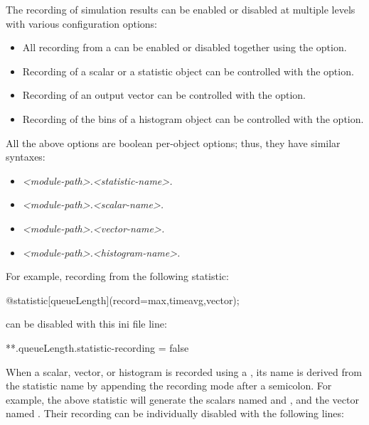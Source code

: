 The recording of simulation results can be enabled or disabled at multiple
levels with various configuration options:

\begin{itemize}
  \item All recording from a  can be enabled or disabled
    together using the  option.
  \item Recording of a scalar or a statistic object can be controlled with the
     option.
  \item Recording of an output vector can be controlled with the
     option.
  \item Recording of the bins of a histogram object can be controlled with the
     option.
\end{itemize}

All the above options are boolean per-object options; thus, they have similar syntaxes:

\begin{itemize}
  \item \textit{<module-path>.<statistic-name>.}
  \item \textit{<module-path>.<scalar-name>.}
  \item \textit{<module-path>.<vector-name>.}
  \item \textit{<module-path>.<histogram-name>.}
\end{itemize}

For example, recording from the following statistic:

\begin{ned}
@statistic[queueLength](record=max,timeavg,vector);
\end{ned}

can be disabled with this ini file line:

\begin{inifile}
**.queueLength.statistic-recording = false
\end{inifile}

When a scalar, vector, or histogram is recorded using a , its
name is derived from the statistic name by appending the recording mode after a
semicolon. For example, the above statistic will generate the scalars named
 and , and the vector named
. Their recording can be individually disabled with the
following lines:

